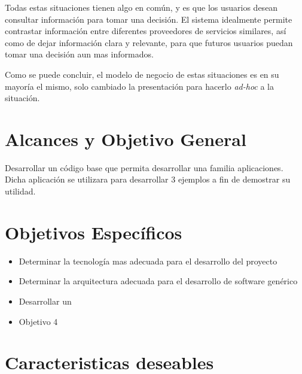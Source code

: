 Todas estas situaciones tienen algo en común, y es que los usuarios desean consultar información para tomar una decisión. El sistema idealmente permite contrastar información entre diferentes proveedores de servicios similares, así como de dejar información clara y relevante, para que futuros usuarios puedan tomar una decisión aun mas informados.

Como se puede concluir, el modelo de negocio de estas situaciones es en su mayoría el mismo, solo cambiado la presentación para hacerlo \textit{ad-hoc} a la situación.

\section{Alcances y Objetivo General}\label{cap:intro:alcances}
Desarrollar un código base que permita desarrollar una familia aplicaciones. Dicha aplicación se utilizara para desarrollar 3 ejemplos a fin de demostrar su utilidad.

\section{Objetivos Específicos}\label{cap:intro:objetivos}
\begin{itemize}
	\item Determinar la tecnología mas adecuada para el desarrollo del proyecto
	\item Determinar la arquitectura adecuada para el desarrollo de software genérico
	\item Desarrollar un \ecommerce
	\item Objetivo 4
\end{itemize}

\section{Caracteristicas deseables}\label{cap:intro:alcance}

